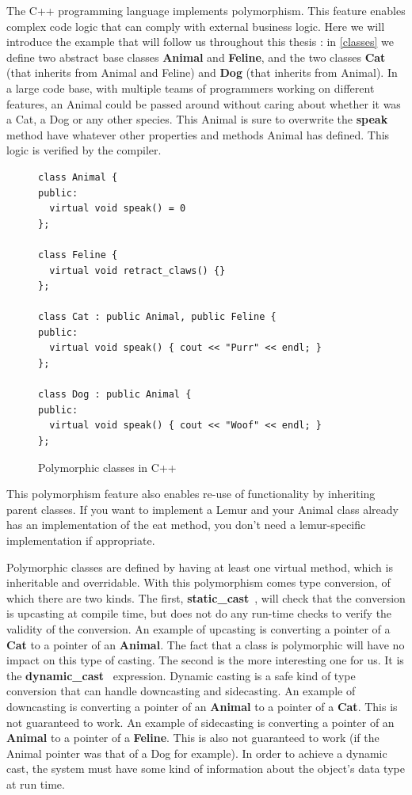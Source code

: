 \documentclass[a4paper,11pt,oneside]{report}
\begin{document}
The C++ programming language implements polymorphism.
This feature enables complex code logic that can comply with external business 
logic.
Here we will introduce the example that will follow us throughout this thesis :
in \autoref{classes} we define two abstract base classes \textbf{Animal} and 
\textbf{Feline},
and the two classes \textbf{Cat} (that inherits from Animal and Feline) and 
\textbf{Dog} (that inherits from Animal).
In a large code base, with multiple teams of programmers working on different 
features,
an Animal could be passed around without caring about whether it was a Cat, a 
Dog or any other species.
This Animal is sure to overwrite the \textbf{speak} method have whatever other 
properties and methods Animal has defined.
This logic is verified by the compiler.

\begin{figure}[h]
\begin{lstlisting}
class Animal {
public:
  virtual void speak() = 0
};

class Feline {
  virtual void retract_claws() {}
};

class Cat : public Animal, public Feline {
public:
  virtual void speak() { cout << "Purr" << endl; }
};

class Dog : public Animal {
public:
  virtual void speak() { cout << "Woof" << endl; }
};
\end{lstlisting}
\caption{Polymorphic classes in C++}
\label{classes}

\end{figure}

This polymorphism feature also enables re-use of functionality by inheriting 
parent classes.
If you want to implement a Lemur and your Animal class already has an 
implementation of the eat method,
you don't need a lemur-specific implementation if appropriate. 

Polymorphic classes are defined by having at least one virtual method, which is 
inheritable and overridable.
With this polymorphism comes type conversion, of which there are two kinds.
The first, \textbf{static\_cast}~\cite{staticcast}, will check that the
conversion is upcasting at compile time,
but does not do any run-time checks to verify the validity of the conversion.
An example of upcasting is converting a pointer of a \textbf{Cat} to a pointer
of an \textbf{Animal}.
The fact that a class is polymorphic will have no impact on this type of 
casting.
The second is the more interesting one for us. It is the 
\textbf{dynamic\_cast}~\cite{dynamiccast} expression.
Dynamic casting is a safe kind of type conversion that can handle downcasting 
and sidecasting.
An example of downcasting is converting a pointer of an \textbf{Animal} to a
pointer of a \textbf{Cat}. This is not guaranteed to work.
An example of sidecasting is converting a pointer of an \textbf{Animal} to a
pointer of a \textbf{Feline}. This is also not guaranteed to work (if the
Animal pointer was that of a Dog for example).
In order to achieve a dynamic cast, the system must have some kind of
information about the object's data type at run time.
\end{document}
